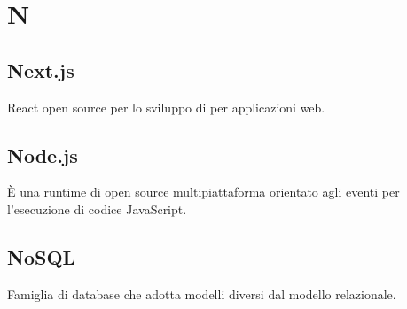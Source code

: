 \section*{N}
\markright{}

\subsection*{Next.js}
 React open source per lo sviluppo di  per applicazioni web. 

\subsection*{Node.js}
È una runtime di  open source multipiattaforma orientato agli eventi per l'esecuzione di codice JavaScript.

\subsection*{NoSQL}
Famiglia di database che adotta modelli diversi dal modello relazionale.